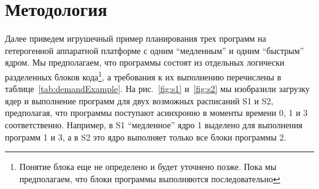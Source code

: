 \chapter{Методология}
\label{chap:met}

Далее приведем игрушечный пример планирования трех программ на гетерогенной аппаратной платформе с одним ``медленным'' и одним ``быстрым'' ядром. Мы предполагаем, что программы состоят из отдельных логически разделенных блоков кода\footnote{Понятие блока еще не определено и будет уточнено позже. Пока мы предполагаем, что блоки программы выполняются последовательно}, а требования к их выполнению перечислены в таблице~\ref{tab:demandExample}. На рис.~\ref{fig:s1} и~\ref{fig:s2} мы изобразили загрузку ядер и выполнение программ для двух возможных расписаний S1 и S2, предполагая, что программы поступают асинхронно в моменты времени 0, 1 и 3 соответственно. Например, в S1 ``медленное'' ядро 1 выделено для выполнения программ 1 и 3, а в S2 это ядро выполняет только все блоки программы 2.

